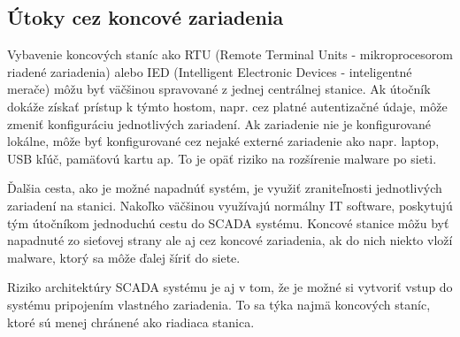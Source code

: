\subsection{Útoky cez koncové zariadenia}
\tab Vybavenie koncových staníc ako RTU (Remote Terminal Units - mikroprocesorom riadené zariadenia) alebo IED (Intelligent Electronic Devices - inteligentné merače) môžu byť väčšinou spravované z jednej centrálnej stanice. Ak útočník dokáže získať prístup k týmto hostom, napr. cez platné autentizačné údaje, môže zmeniť konfiguráciu jednotlivých zariadení. Ak zariadenie nie je konfigurované lokálne, môže byť konfigurované cez nejaké externé zariadenie ako napr. laptop, USB kľúč, pamäťovú kartu ap. To je opäť riziko na rozšírenie malware po sieti. \par
Ďalšia cesta, ako je možné napadnúť systém, je využiť zraniteľnosti jednotlivých zariadení na stanici. Nakoľko väčšinou využívajú normálny IT software, poskytujú tým útočníkom jednoduchú cestu do SCADA systému. Koncové stanice môžu byť napadnuté zo sieťovej strany ale aj cez koncové zariadenia, ak do nich niekto vloží malware, ktorý sa môže ďalej šíriť do siete. \par
Riziko architektúry SCADA systému je aj v tom, že je možné si vytvoriť vstup do systému pripojením vlastného zariadenia. To sa týka najmä koncových staníc, ktoré sú menej chránené ako riadiaca stanica\cite{Security}.
